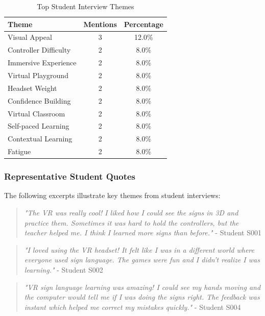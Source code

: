 \documentclass[12pt,a4paper]{article}
\begin{document}
\begin{table}[H]
\centering
\caption{Top Student Interview Themes}
\begin{tabular}{lcc}
\toprule
\textbf{Theme} & \textbf{Mentions} & \textbf{Percentage} \\
\midrule
Visual Appeal & 3 & 12.0\% \\
Controller Difficulty & 2 & 8.0\% \\
Immersive Experience & 2 & 8.0\% \\
Virtual Playground & 2 & 8.0\% \\
Headset Weight & 2 & 8.0\% \\
Confidence Building & 2 & 8.0\% \\
Virtual Classroom & 2 & 8.0\% \\
Self-paced Learning & 2 & 8.0\% \\
Contextual Learning & 2 & 8.0\% \\
Fatigue & 2 & 8.0\% \\
\bottomrule
\end{tabular}
\end{table}

\subsubsection{Representative Student Quotes}

The following excerpts illustrate key themes from student interviews:

\begin{quote}
\textit{"The VR was really cool! I liked how I could see the signs in 3D and practice them. Sometimes it was hard to hold the controllers, but the teacher helped me. I think I learned more signs than before."} - Student S001
\end{quote}

\begin{quote}
\textit{"I loved using the VR headset! It felt like I was in a different world where everyone used sign language. The games were fun and I didn't realize I was learning."} - Student S002
\end{quote}

\begin{quote}
\textit{"VR sign language learning was amazing! I could see my hands moving and the computer would tell me if I was doing the signs right. The feedback was instant which helped me correct my mistakes quickly."} - Student S004
\end{quote}
\end{document}
